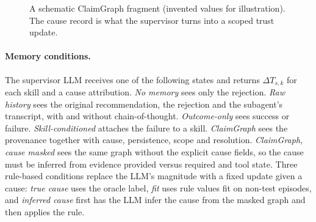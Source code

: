 \documentclass[letterpaper]{article}
\newcommand{\dT}{\Delta T}
\begin{document}
\begin{figure}[t]
\centering
{}
\caption{A schematic ClaimGraph fragment (invented values for illustration). The cause record is what the supervisor turns into a scoped trust update.}
\label{fig:graph}
\end{figure}

\paragraph{Memory conditions.}
The supervisor LLM receives one of the following states and returns $\dT_{s,k}$ for each skill and a cause attribution.
\emph{No memory} sees only the rejection.
\emph{Raw history} sees the original recommendation, the rejection and the subagent's transcript, with and without chain-of-thought.
\emph{Outcome-only} sees success or failure.
\emph{Skill-conditioned} attaches the failure to a skill.
\emph{ClaimGraph} sees the provenance together with cause, persistence, scope and resolution.
\emph{ClaimGraph, cause masked} sees the same graph without the explicit cause fields, so the cause must be inferred from evidence provided versus required and tool state.
Three rule-based conditions replace the LLM's magnitude with a fixed update given a cause: \emph{true cause} uses the oracle label, \emph{fit} uses rule values fit on non-test episodes, and \emph{inferred cause} first has the LLM infer the cause from the masked graph and then applies the rule.
\end{document}
